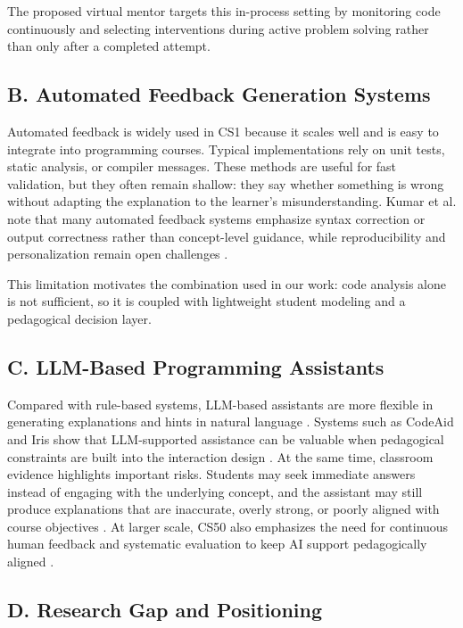 \documentclass[conference]{IEEEtran}
\begin{document}
The proposed virtual mentor targets this in-process setting by monitoring code continuously and selecting interventions during active problem solving rather than only after a completed attempt.

\subsection*{B. Automated Feedback Generation Systems}

Automated feedback is widely used in CS1 because it scales well and is easy to integrate into programming courses. Typical implementations rely on unit tests, static analysis, or compiler messages. These methods are useful for fast validation, but they often remain shallow: they say whether something is wrong without adapting the explanation to the learner's misunderstanding. Kumar et al. note that many automated feedback systems emphasize syntax correction or output correctness rather than concept-level guidance, while reproducibility and personalization remain open challenges \cite{NavigatingAutomatedFeedback}.

This limitation motivates the combination used in our work: code analysis alone is not sufficient, so it is coupled with lightweight student modeling and a pedagogical decision layer.

\subsection*{C. LLM-Based Programming Assistants}

Compared with rule-based systems, LLM-based assistants are more flexible in generating explanations and hints in natural language \cite{SystematicLiteratureReviewonLLM}. Systems such as CodeAid and Iris show that LLM-supported assistance can be valuable when pedagogical constraints are built into the interaction design \cite{CodeAid,IRIS}. At the same time, classroom evidence highlights important risks. Students may seek immediate answers instead of engaging with the underlying concept, and the assistant may still produce explanations that are inaccurate, overly strong, or poorly aligned with course objectives \cite{PatternsofLLMPoweredProgrammingAssistant,FeasibilityStudyofAugmentingTeachingAssistantswithAI}. At larger scale, CS50 also emphasizes the need for continuous human feedback and systematic evaluation to keep AI support pedagogically aligned \cite{ImprovingAIinCS50}.

\subsection*{D. Research Gap and Positioning}
\end{document}
